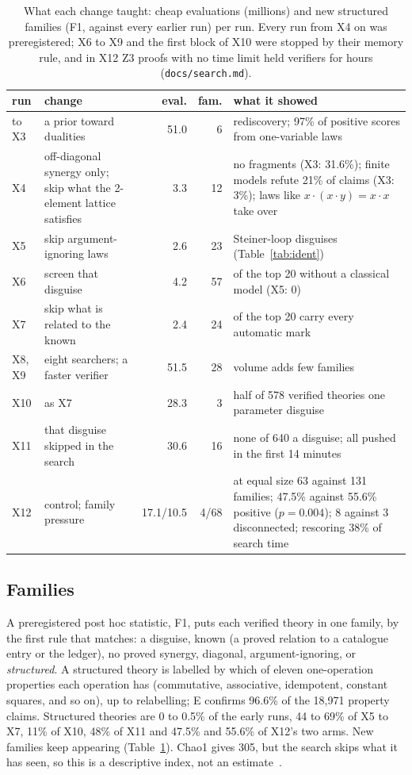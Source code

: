 \documentclass[11pt]{article}
\newcommand{\op}{\cdot}
\begin{document}
\begin{table}[!htb]\centering\small
\begin{tabular}{@{}l>{\raggedright\arraybackslash}p{}rr>{\raggedright\arraybackslash}p{}@{}}\toprule
run & change & eval. & fam. & what it showed \\\midrule
to X3 & a prior toward dualities & 51.0 & 6 & rediscovery; 97\% of positive scores from one-variable laws \\
X4 & off-diagonal synergy only; skip what the 2-element lattice satisfies & 3.3 & 12 & no fragments (X3: 31.6\%);
  finite models refute 21\% of claims (X3: 3\%); laws like $x\op(x\op y)=x\op x$ take over \\
X5 & skip argument-ignoring laws & 2.6 & 23 & Steiner-loop disguises (Table~\ref{tab:ident}) \\
X6 & screen that disguise & 4.2 & 57 & 11 of the top 20 without a classical model (X5: 0) \\
X7 & skip what is related to the known & 2.4 & 24 & 12 of the top 20 carry every automatic mark \\
X8, X9 & eight searchers; a faster verifier & 51.5 & 28 & volume adds few families \\
X10 & as X7 & 28.3 & 3 & half of 578 verified theories one parameter disguise \\
X11 & that disguise skipped in the search & 30.6 & 16 & none of 640 a disguise; all pushed in the first 14 minutes \\
X12 & control; family pressure & 17.1/10.5 & 4/68 & at equal size 63 against 131 families; 47.5\% against 55.6\%
  positive ($p=0.004$); 8 against 3 disconnected; rescoring 38\% of search time \\
\bottomrule\end{tabular}
\caption{What each change taught: cheap evaluations (millions) and new structured families (F1, against every earlier
run) per run. Every run from X4 on was preregistered; X6 to X9 and the first block of X10 were stopped by their memory
rule, and in X12 Z3 proofs with no time limit held verifiers for hours (\texttt{docs/search.md}).}\label{tab:runs}
\end{table}

\subsection{Families}
A preregistered post hoc statistic, F1, puts each verified theory in one family, by the first rule that matches: a
disguise, known (a proved relation to a catalogue entry or the ledger), no proved synergy, diagonal,
argument-ignoring, or \emph{structured}. A structured theory is labelled by which of eleven one-operation properties
each operation has (commutative, associative, idempotent, constant squares, and so on), up to relabelling; E confirms
96.6\% of the 18{,}971 property claims. Structured theories are 0 to 0.5\% of the early runs, 44 to 69\% of X5 to
X7, 11\% of X10, 48\% of X11 and 47.5\% and 55.6\% of X12's two arms. New families keep appearing
(Table~\ref{tab:runs}). Chao1 gives 305, but the search skips what it has seen, so this is a descriptive index, not an
estimate~\cite{stads2018}.
\end{document}
